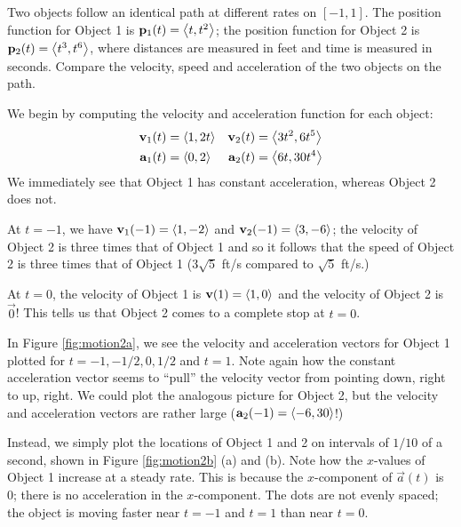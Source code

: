 \documentclass{ximera}
\begin{document}
\begin{example}
  Two objects follow an identical path at different rates on
  $[-1,1]$. The position function for Object 1 is $\mathbf{p}_1(t) = \left\langle 
  t, t^2\right\rangle$; the position function for Object 2 is $\mathbf{p}_2(t) = \left\langle 
  t^3, t^6\right\rangle$, where distances are measured in feet and time is
  measured in seconds. Compare the velocity, speed and acceleration of
  the two objects on the path.
  \begin{explanation}
    We begin by computing the velocity and acceleration function for
    each object:
    \begin{align*}
      \mathbf v_1(t) &= \left\langle 1,2t\right\rangle & \mathbf v_2(t) &= \left\langle 3t^2,6t^5\right\rangle \\
      \mathbf a_1(t) &= \left\langle 0,2\right\rangle & \mathbf a_2(t) &=\left\langle 6t,30t^4\right\rangle
    \end{align*}
    We immediately see that Object 1 has constant acceleration, whereas Object 2 does not. 
    
    At $t=-1$, we have $\mathbf v_1(-1) = \left\langle 1,-2\right\rangle$ and $\mathbf v_2(-1) =
    \left\langle 3,-6\right\rangle$; the velocity of Object 2 is three times that of Object 1
    and so it follows that the speed of Object 2 is three times that of
    Object 1 ($3\sqrt{5}$ ft/s compared to $\sqrt{5}$ ft/s.)

    At $t=0$, the velocity of Object 1 is $\mathbf v(1) = \left\langle 1,0\right\rangle$ and the
    velocity of Object 2 is $\vec 0$! This tells us that Object 2 comes to
a complete stop at $t=0$.

In Figure \ref{fig:motion2a}, we see the velocity and acceleration
vectors for Object 1 plotted for $t=-1, -1/2, 0, 1/2$ and $t=1$. Note
again how the constant acceleration vector seems to ``pull'' the
velocity vector from pointing down, right to up, right. We could plot
the analogous picture for Object 2, but the velocity and acceleration
vectors are rather large ($\mathbf a_2(-1) = \left\langle -6,30\right\rangle$!)

Instead, we simply plot the locations of Object 1 and 2 on intervals
of $1/10$ of a second, shown in Figure \ref{fig:motion2b}
(a) and (b). Note how the $x$-values of Object 1 increase at a steady
rate. This is because the $x$-component of $\vec a(t)$ is 0; there is
no acceleration in the $x$-component. The dots are not evenly spaced;
the object is moving faster near $t=-1$ and $t=1$ than near $t=0$.


\end{explanation}
\end{example}
\end{document}
